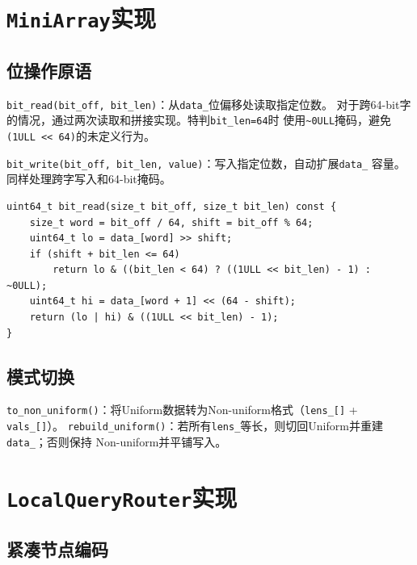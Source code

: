 \documentclass[
    type = bachelor,
    fontset = win,
    decl-page = true,
  ]{njuthesis}
\begin{document}
\section{\texttt{MiniArray}实现}\label{sec:ma-impl}

\subsection{位操作原语}

\texttt{bit\_read(bit\_off, bit\_len)}：从\texttt{data\_}位偏移处读取指定位数。
对于跨64-bit字的情况，通过两次读取和拼接实现。特判\texttt{bit\_len=64}时
使用\texttt{\textasciitilde 0ULL}掩码，避免\texttt{(1ULL << 64)}的未定义行为。

\texttt{bit\_write(bit\_off, bit\_len, value)}：写入指定位数，自动扩展\texttt{data\_}
容量。同样处理跨字写入和64-bit掩码。

\begin{lstlisting}[caption={bit\_read 位读取实现}]
uint64_t bit_read(size_t bit_off, size_t bit_len) const {
    size_t word = bit_off / 64, shift = bit_off % 64;
    uint64_t lo = data_[word] >> shift;
    if (shift + bit_len <= 64)
        return lo & ((bit_len < 64) ? ((1ULL << bit_len) - 1) : ~0ULL);
    uint64_t hi = data_[word + 1] << (64 - shift);
    return (lo | hi) & ((1ULL << bit_len) - 1);
}
\end{lstlisting}

\subsection{模式切换}

\texttt{to\_non\_uniform()}：将Uniform数据转为Non-uniform格式（\texttt{lens\_[]} + \texttt{vals\_[]}）。
\texttt{rebuild\_uniform()}：若所有\texttt{lens\_}等长，则切回Uniform并重建\texttt{data\_}；否则保持
Non-uniform并平铺写入。

\section{\texttt{LocalQueryRouter}实现}

\subsection{紧凑节点编码}
\end{document}
